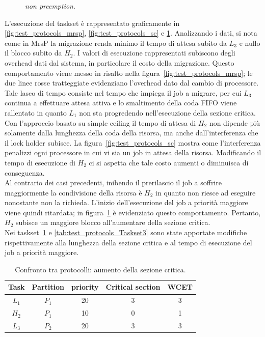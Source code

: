     \begin{figure}
      \centering
      \RisultatoUnoNoPreempion
      \caption{\textit{non preemption}.}
      \label{fig:test_protocols_np}
    \end{figure}

L'esecuzione del taskset è rappresentato graficamente in \ref{fig:test_protocols_mrsp}, \ref{fig:test_protocols_sc} e \ref{fig:test_protocols_np}. Analizzando i dati, si nota come in MrsP la migrazione renda minimo il tempo di attesa subito da $L_3$ e nullo il blocco subito da $H_2$. I valori di esecuzione rappresentati subiscono degli overhead dati dal sistema, in particolare il costo della migrazione. Questo comportamento viene messo in risalto nella figura~\ref{fig:test_protocols_mrsp}; le due linee rosse tratteggiate evidenziano l'overhead dato dal cambio di processore. Tale lasco di tempo consiste nel tempo che impiega il job a migrare, per cui $L_3$ continua a effettuare attesa attiva e lo smaltimento della coda FIFO viene rallentato in quanto $L_1$ non sta progredendo nell'esecuzione della sezione critica.\\
Con l'approccio basato su simple ceiling il tempo di attesa di $H_2$ non dipende più solamente dalla lunghezza della coda della risorsa, ma anche dall'interferenza che il lock holder subisce. La figura~\ref{fig:test_protocols_sc} mostra come l'interferenza penalizzi ogni processore in cui vi sia un job in attesa della risorsa. Modificando il tempo di esecuzione di $H_2$ ci si aspetta che tale costo aumenti o diminuisca di conseguenza.\\
Al contrario dei casi precedenti, inibendo il prerilascio il job a soffrire maggiormente la condivisione della risorsa è $H_2$ in quanto non riesce ad eseguire nonostante non la richieda. L'inizio dell'esecuzione del job a priorità maggiore viene quindi ritardata; in figura~\ref{fig:test_protocols_np} è evidenziato questo comportamento. Pertanto, $H_2$ subisce un maggiore blocco all'aumentare della sezione critica.\\

Nei taskset~\ref{tab:test_protocols_Taskset2} e \ref{tab:test_protocols_Taskset3} sono state apportate modifiche rispettivamente alla lunghezza della sezione critica e al tempo di esecuzione del job a priorità maggiore.\\

\begin{table}
  \centering
  \begin{tabular}{ccccc}
  \hline\hline
    Task & Partition     & priority & Critical section & WCET  \\ \hline
    $L_1$ & $P_1$  & 20 & 3 & 3 \\
    $H_2$ & $P_1$  & 10 & 0 & 1 \\
    $L_3$ & $P_2$  & 20 & 3 & 3 \\
    \hline
    \end{tabular}
  \caption{Confronto tra protocolli: aumento della sezione critica.}
  \label{tab:test_protocols_Taskset2}
  \end{table}

